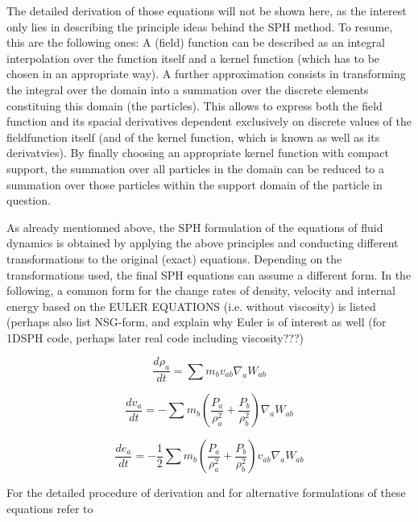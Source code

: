 \documentclass{report}
\begin{document}
The detailed derivation of those equations will not be shown here, as the
interest  only lies in describing the principle ideas behind the SPH
method. To resume, this are the following ones: A (field) function can be
described as an integral interpolation over the function itself and a kernel
function (which has to be chosen in an appropriate way). A further
approximation consists in transforming the integral over the domain into a
summation over the discrete elements constituing this domain (the particles). This allows to express both
the field function and its spacial derivatives dependent exclusively on discrete values
of the fieldfunction itself (and of the kernel function, which is known as well as
its derivatvies). By finally choosing an appropriate kernel function with
compact support, the summation over all particles in the domain can be reduced
to a summation over those particles within the support domain of the particle
in question.

As already mentionned above, the SPH formulation of the equations of fluid
dynamics is obtained by applying the above principles and conducting different
transformations to the original (exact) equations. Depending on the
transformations used, the final SPH equations can assume a different form. In
the following, a common form for the change rates of density, velocity and
internal energy based on the EULER EQUATIONS (i.e. without viscosity) is
listed\cite{Monaghan2005,Liu2003} (perhaps also list NSG-form, and
explain why Euler is of interest as well (for 1DSPH code, perhaps later real
code including viscosity???)

\begin{equation}
\label{eq:DCR_Euler}
\frac{d\rho _a}{\mathit{dt}}=\sum{m_{b}v_{\mathit{ab}}\nabla _{a}W_{\mathit{ab}}}
\end{equation}

\begin{equation}
\label{eq:VCR_Euler}
\frac{dv_{a}}{\mathit{dt}}=-\sum {m_{b}\left(\frac{P_{a}}{\rho_{a}^{2}}+\frac{P_{b}}{\rho _{b}^{2}}\right)\nabla_{a}W_{ab}}
\end{equation}


\begin{equation}
\label{eq:ECR_Euler}
\frac{de_{a}}{\mathit{dt}}=-\mathit{}\frac{1}{2}\sum{m_{b}\left(\frac{P_{a}}{\rho _{a}^{2}}+\frac{P_{b}}{\rho _{b}^{2}}\right)v_{\mathit{ab}}\nabla _{a}W_{\mathit{ab}}}
\end{equation}

For the detailed procedure of derivation and for alternative formulations of
these equations refer to \cite{Monaghan2005, Liu2003}
\end{document}
